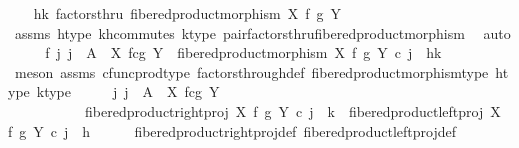 \begin{isabellebody}
\isanewline
\ \ \isamarkupfalse%
\ {\isachardoublequoteopen}{\isasymlangle}h{\isacharcomma}{\kern0pt}k{\isasymrangle}\ factorsthru\ fibered{\isacharunderscore}{\kern0pt}product{\isacharunderscore}{\kern0pt}morphism\ X\ f\ g\ Y{\isachardoublequoteclose}\isanewline
\ \ \ \ \isamarkupfalse%
\ assms\ h{\isacharunderscore}{\kern0pt}type\ k{\isacharunderscore}{\kern0pt}h{\isacharunderscore}{\kern0pt}commutes\ k{\isacharunderscore}{\kern0pt}type\ pair{\isacharunderscore}{\kern0pt}factorsthru{\isacharunderscore}{\kern0pt}fibered{\isacharunderscore}{\kern0pt}product{\isacharunderscore}{\kern0pt}morphism\ \isamarkupfalse%
\ auto\isanewline
\ \ \isamarkupfalse%
\ \isamarkupfalse%
\ f{}{\isacharcolon}{\kern0pt}\ {\isachardoublequoteopen}{\isasymexists}j{\isachardot}{\kern0pt}\ j\ {\isacharcolon}{\kern0pt}\ A\ {\isasymrightarrow}\ X\ \isactrlbsub f\isactrlesub {\isasymtimes}\isactrlsub c\isactrlbsub g\isactrlesub \ Y\ {\isasymand}\ fibered{\isacharunderscore}{\kern0pt}product{\isacharunderscore}{\kern0pt}morphism\ X\ f\ g\ Y\ {\isasymcirc}\isactrlsub c\ j\ {\isacharequal}{\kern0pt}\ {\isasymlangle}h{\isacharcomma}{\kern0pt}k{\isasymrangle}{\isachardoublequoteclose}\isanewline
\ \ \ \ \isamarkupfalse%
\ {\isacharparenleft}{\kern0pt}meson\ assms\ cfunc{\isacharunderscore}{\kern0pt}prod{\isacharunderscore}{\kern0pt}type\ factors{\isacharunderscore}{\kern0pt}through{\isacharunderscore}{\kern0pt}def{}\ fibered{\isacharunderscore}{\kern0pt}product{\isacharunderscore}{\kern0pt}morphism{\isacharunderscore}{\kern0pt}type\ h{\isacharunderscore}{\kern0pt}type\ k{\isacharunderscore}{\kern0pt}type{\isacharparenright}{\kern0pt}\isanewline
\ \ \isamarkupfalse%
\ \isamarkupfalse%
\ {\isachardoublequoteopen}{\isasymexists}j{\isachardot}{\kern0pt}\ j\ {\isacharcolon}{\kern0pt}\ A\ {\isasymrightarrow}\ X\ \isactrlbsub f\isactrlesub {\isasymtimes}\isactrlsub c\isactrlbsub g\isactrlesub \ Y\ {\isasymand}\isanewline
\ \ \ \ \ \ \ \ \ \ \ fibered{\isacharunderscore}{\kern0pt}product{\isacharunderscore}{\kern0pt}right{\isacharunderscore}{\kern0pt}proj\ X\ f\ g\ Y\ {\isasymcirc}\isactrlsub c\ j\ {\isacharequal}{\kern0pt}\ k\ {\isasymand}\ fibered{\isacharunderscore}{\kern0pt}product{\isacharunderscore}{\kern0pt}left{\isacharunderscore}{\kern0pt}proj\ X\ f\ g\ Y\ {\isasymcirc}\isactrlsub c\ j\ {\isacharequal}{\kern0pt}\ h{\isachardoublequoteclose}\isanewline
\ \ \ \ \isamarkupfalse%
\ fibered{\isacharunderscore}{\kern0pt}product{\isacharunderscore}{\kern0pt}right{\isacharunderscore}{\kern0pt}proj{\isacharunderscore}{\kern0pt}def\ fibered{\isacharunderscore}{\kern0pt}product{\isacharunderscore}{\kern0pt}left{\isacharunderscore}{\kern0pt}proj{\isacharunderscore}{\kern0pt}def\ \isanewline

\end{isabellebody}
